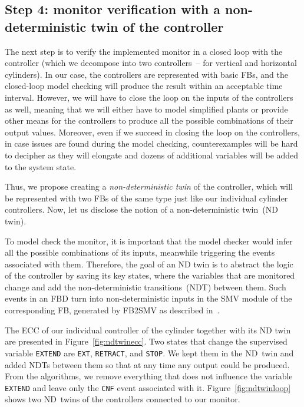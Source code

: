 \begin{bibunit}
\subsection{Step 4: monitor verification with a non-deterministic twin of the controller }
\label{sec:monitorver}
The next step is to verify the implemented monitor in a closed loop with the controller (which we decompose into two controllers~-- for vertical and horizontal cylinders). In our case, the controllers are represented with basic FBs, and the closed-loop model checking will produce the result within an acceptable time interval. However, we will have to close the loop on the inputs of the controllers as well, meaning that we will either have to model simplified plants or provide other means for the controllers to produce all the possible combinations of their output values. Moreover, even if we succeed in closing the loop on the controllers, in case issues are found during the model checking, counterexamples will be hard to decipher as they will elongate and dozens of additional variables will be added to the system state.

Thus, we propose creating a \emph{non-deterministic twin} of the controller, which will be represented with two FBs of the same type just like our individual cylinder controllers. Now, let us disclose the notion of a non-deterministic twin~(ND twin). 

To model check the monitor, it is important that the model checker would infer all the possible combinations of its inputs, meanwhile triggering the events associated with them. Therefore, the goal of an ND twin is to abstract the logic of the controller by saving its key states, where the variables that are monitored change and add the non-deterministic transitions~(NDT) between them. Such events in an FBD turn into non-deterministic inputs in the SMV module of the corresponding FB, generated by FB2SMV as described in~\cite{agn_case_study}. 

The ECC of our individual controller of the cylinder together with its ND twin are presented in Figure~\ref{fig:ndtwinecc}. Two states that change the supervised variable \texttt{EXTEND} are \texttt{EXT}, \texttt{RETRACT}, and \texttt{STOP}. We kept them in the ND~twin and added NDTs between them so that at any time any output could be produced. From the algorithms, we remove everything that does not influence the variable \texttt{EXTEND} and leave only the \texttt{CNF} event associated with it. Figure~\ref{fig:ndtwinloop} shows two ND~twins of the controllers connected to our monitor.


\end{bibunit}
